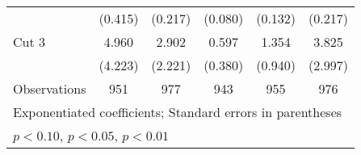 \begin{table}[htbp]
\begin{tabular}{l*{5}{c}}
                &  (0.415)         &  (0.217)         &  (0.080)         &  (0.132)         &  (0.217)         \\
[1em]
Cut 3           &    4.960\sym{*}  &    2.902         &    0.597         &    1.354         &    3.825\sym{*}  \\
                &  (4.223)         &  (2.221)         &  (0.380)         &  (0.940)         &  (2.997)         \\
\hline
Observations    &      951         &      977         &      943         &      955         &      976         \\
\hline\hline
\multicolumn{6}{l}{\footnotesize Exponentiated coefficients; Standard errors in parentheses}\\
\multicolumn{6}{l}{\footnotesize \sym{*} \(p<0.10\), \sym{**} \(p<0.05\), \sym{***} \(p<0.01\)}\\
\end{tabular}
\end{table}
